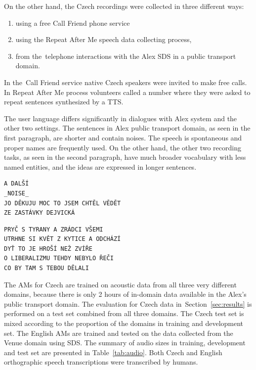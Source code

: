 On the other hand, the Czech recordings were collected in three different ways\cite{korvas_2014}:
\begin{enumerate}
    \item using a free Call Friend phone service
    \item using the Repeat After Me speech data collecting process,
    \item from the~telephone interactions with the Alex \ac{SDS} in a public transport domain.
\end{enumerate}

In the~Call Friend service native Czech speakers were invited to make free calls.
In Repeat After Me process volunteers called a number where they were asked to repeat 
sentences synthesized by a \ac{TTS}.

The user language differs significantly in dialogues with Alex system and the other two settings.
The sentences in Alex public transport domain, as seen in the first paragraph, are shorter and contain noises.
The speech is spontaneous and proper names are frequently used.
On the other hand, the other two recording tasks, as seen in the second paragraph, have much broader vocabulary with less named entities, and the ideas are expressed in longer sentences.

\begin{verbatim}
A DALŠÍ
_NOISE_
JO DĚKUJU MOC TO JSEM CHTĚL VĚDĚT
ZE ZASTÁVKY DEJVICKÁ
\end{verbatim}

\begin{verbatim}
PRYČ S TYRANY A ZRÁDCI VŠEMI
UTRHNE SI KVĚT Z KYTICE A ODCHÁZÍ
DYŤ TO JE HROŠÍ NEŽ ZVÍŘE
O LIBERALIZMU TEHDY NEBYLO ŘEČI
CO BY TAM S TEBOU DĚLALI
\end{verbatim}


The \acp{AM} for Czech are trained on acoustic data from all three very different domains, because there is only 2 hours of in-domain data available in the Alex's public transport domain.
The evaluation for Czech data in~Section~\ref{sec:results} is performed  on a test set combined from all three domains.
The Czech test set is mixed according to the proportion of the domains in training and development set.
The English \acp{AM} are trained and tested on the data collected from the Venue domain using \ac{SDS}.
The summary of audio sizes in training, development and test set are presented in Table~\ref{tab:audio}.
Both Czech and English orthographic speech transcriptions were transcribed by humans.

